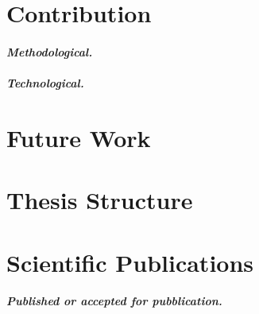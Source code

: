 \documentclass[12pt]{article}
\begin{document}
\section{Contribution}\label{sec:contribution}

\paragraph{\emph{Methodological.}}

% 

\paragraph{\emph{Technological.}}



\section{Future Work}\label{sec:future}

	

\section{Thesis Structure}\label{sec:structure}


\section{Scientific Publications}\label{sec:pubblications}

\sloppypar
\paragraph{\emph{Published or accepted for pubblication.}}
\end{document}
